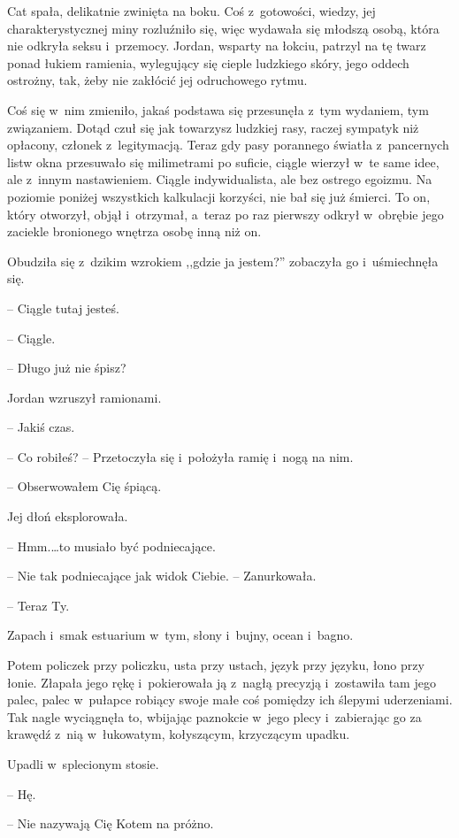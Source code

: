 \documentclass[oneside,polish,11pt,sfheadings]{mwbk}
\begin{document}
Cat spała, delikatnie zwinięta na boku. Coś z~gotowości, wiedzy, jej
charakterystycznej miny rozluźniło się, więc wydawała się młodszą osobą,
która nie odkryła seksu i~przemocy. Jordan, wsparty na łokciu, patrzyl
na tę twarz ponad łukiem ramienia, wylegujący się cieple ludzkiego
skóry, jego oddech ostrożny, tak, żeby nie zakłócić jej odruchowego
rytmu.

Coś się w~nim zmieniło, jakaś podstawa się przesunęła z~tym wydaniem,
tym związaniem. Dotąd czuł się jak towarzysz ludzkiej rasy, raczej
sympatyk niż opłacony, członek z~legitymacją. Teraz gdy pasy porannego
światła z~pancernych listw okna przesuwało się milimetrami po suficie,
ciągle wierzył w~te same idee, ale z~innym nastawieniem. Ciągle
indywidualista, ale bez ostrego egoizmu. Na poziomie poniżej wszystkich
kalkulacji korzyści, nie bał się już śmierci. To on, który otworzył,
objął i~otrzymał, a~teraz po raz pierwszy odkrył w~obrębie jego zaciekle
bronionego wnętrza osobę inną niż on.

Obudziła się z~dzikim wzrokiem ,,gdzie ja jestem?'' zobaczyła go i~uśmiechnęła się.

-- Ciągle tutaj jesteś.

-- Ciągle.

-- Długo już nie śpisz?

Jordan wzruszył ramionami. 

-- Jakiś czas.

-- Co robiłeś? -- Przetoczyła się i~położyła ramię i~nogą na nim.

-- Obserwowałem Cię śpiącą.

Jej dłoń eksplorowała. 

-- Hmm.\ldots to musiało być podniecające.

-- Nie tak podniecające jak widok Ciebie. -- Zanurkowała.

-- Teraz Ty.

Zapach i~smak estuarium w~tym, słony i~bujny, ocean i~bagno.

Potem policzek przy policzku, usta przy ustach, język przy języku, łono
przy łonie. Złapała jego rękę i~pokierowała ją z~nagłą precyzją i~zostawiła tam jego palec, palec w~pułapce robiący swoje małe coś
pomiędzy ich ślepymi uderzeniami. Tak nagle wyciągnęła to, wbijając
paznokcie w~jego plecy i~zabierając go za krawędź z~nią w~łukowatym,
kołyszącym, krzyczącym upadku.

Upadli w~splecionym stosie.

-- Hę.

-- Nie nazywają Cię Kotem na próżno.
\end{document}
